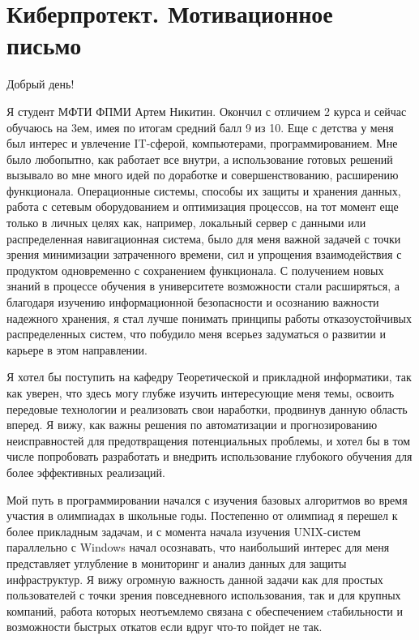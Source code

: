 \section{\textbf{Киберпротект. Мотивационное письмо}}
\smallskip

\quad Добрый день!
\smallskip

\quad Я студент МФТИ ФПМИ Артем Никитин. Окончил с отличием 2 курса и сейчас обучаюсь на 3ем, имея по итогам средний балл 9 из 10. Еще с
детства у меня был интерес и увлечение IT-сферой, компьютерами, программированием. Мне было любопытно, как работает все внутри, а использование
готовых решений вызывало во мне много идей по доработке и совершенствованию, расширению функционала. Операционные системы, способы их защиты и
хранения данных, работа с сетевым оборудованием и оптимизация процессов, на тот момент еще только в личных целях как, например, локальный
сервер с данными или распределенная навигационная система, было для меня важной задачей с точки зрения минимизации затраченного времени, сил и
упрощения взаимодействия с продуктом одновременно с сохранением функционала. С получением новых знаний в процессе обучения в университете
возможности стали расширяться, а благодаря изучению информационной безопасности и осознанию важности надежного хранения, я стал лучше понимать
принципы работы отказоустойчивых распределенных систем, что побудило меня всерьез задуматься о развитии и карьере в этом направлении.

\quad Я хотел бы поступить на кафедру Теоретической и прикладной информатики, так как уверен, что здесь могу глубже изучить интересующие меня
темы, освоить передовые технологии и реализовать свои наработки, продвинув данную область вперед. Я вижу, как важны решения по автоматизации и
прогнозированию неисправностей для предотвращения потенциальных проблемы, и хотел бы в том числе попробовать разработать и внедрить
использование глубокого обучения для более эффективных реализаций.

\quad Мой путь в программировании начался с изучения базовых алгоритмов во время участия в олимпиадах в школьные годы. Постепенно от олимпиад
я перешел к более прикладным задачам, и с момента начала изучения UNIX-систем параллельно с Windows начал осознавать, что наибольший интерес
для меня представляет углубление в мониторинг и анализ данных для защиты инфраструктур. Я вижу огромную важность данной задачи как для простых
пользователей с точки зрения повседневного использования, так и для крупных компаний, работа которых неотъемлемо связана с обеспечением
cтабильности и возможности быстрых откатов если вдруг что-то пойдет не так.

